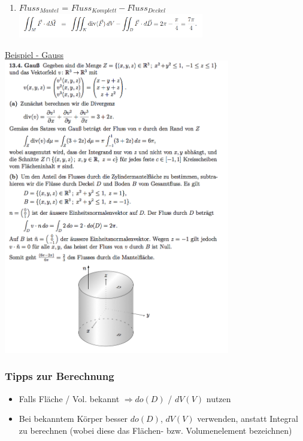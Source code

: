 \documentclass[6pt]{article}
\begin{document}
\begin{multicols*}{3}
\begin{enumerate}[label=(\roman*)]
				\item $Fluss_{Mantel}$ = $Fluss_{Komplett} - Fluss_{Deckel}$ \\
				\includegraphics[width=230pt]{images/kegelaufgabe4}


		\end{enumerate}
 	
 		\columnbreak
 		
 		\underline{Beispiel - Gauss} \vspace{4mm}\\
 		\includegraphics[width=280pt]{images/gauss}
		

		\subsubsection*{Tipps zur Berechnung}
		
		\begin{itemize}
				\item Falls Fl{\"a}che / Vol. bekannt $\Rightarrow do(D)$ / $dV(V)$ nutzen
				\item Bei bekanntem K{\"o}rper besser $do(D)$, $dV(V) $	verwenden, anstatt Integral zu berechnen (wobei diese das Fl{\"a}chen- bzw. Volumenelement bezeichnen)
		\end{itemize}


\end{multicols*}
\end{document}
